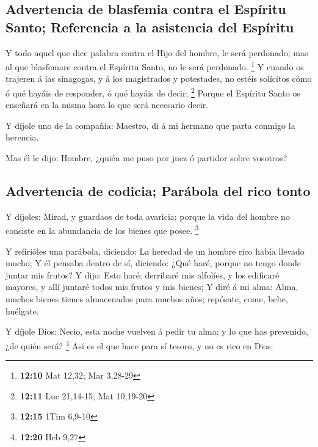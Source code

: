 \hypertarget{advertencia-de-blasfemia-contra-el-espuxedritu-santo-referencia-a-la-asistencia-del-espuxedritu}{%
\subsection{Advertencia de blasfemia contra el Espíritu Santo;
Referencia a la asistencia del
Espíritu}\label{advertencia-de-blasfemia-contra-el-espuxedritu-santo-referencia-a-la-asistencia-del-espuxedritu}}

 Y todo aquel que dice palabra contra el Hijo del hombre,
le será perdonado; mas al que blasfemare contra el Espíritu Santo, no le
será perdonado. \footnote{\textbf{12:10} Mat 12,32; Mar 3,28-29}
 Y cuando os trajeren á las sinagogas, y á los
magistrados y potestades, no estéis solícitos cómo ó qué hayáis de
responder, ó qué hayáis de decir; \footnote{\textbf{12:11} Luc 21,14-15;
  Mat 10,19-20}  Porque el Espíritu Santo os enseñará en
la misma hora lo que será necesario decir.

 Y díjole uno de la compañía: Maestro, di á mi hermano
que parta conmigo la herencia.

 Mas él le dijo: Hombre, ¿quién me puso por juez ó
partidor sobre vosotros?

\hypertarget{advertencia-de-codicia-paruxe1bola-del-rico-tonto}{%
\subsection{Advertencia de codicia; Parábola del rico
tonto}\label{advertencia-de-codicia-paruxe1bola-del-rico-tonto}}

 Y díjoles: Mirad, y guardaos de toda avaricia; porque la
vida del hombre no consiste en la abundancia de los bienes que posee.
\footnote{\textbf{12:15} 1Tim 6,9-10}

 Y refirióles una parábola, diciendo: La heredad de un
hombre rico había llevado mucho;  Y él pensaba dentro de
sí, diciendo: ¿Qué haré, porque no tengo donde juntar mis frutos?
 Y dijo: Esto haré: derribaré mis alfolíes, y los
edificaré mayores, y allí juntaré todos mis frutos y mis bienes;
 Y diré á mi alma: Alma, muchos bienes tienes almacenados
para muchos años; repósate, come, bebe, huélgate.

 Y díjole Dios: Necio, esta noche vuelven á pedir tu
alma; y lo que has prevenido, ¿de quién será? \footnote{\textbf{12:20}
  Heb 9,27}  Así es el que hace para sí tesoro, y no es
rico en Dios.

